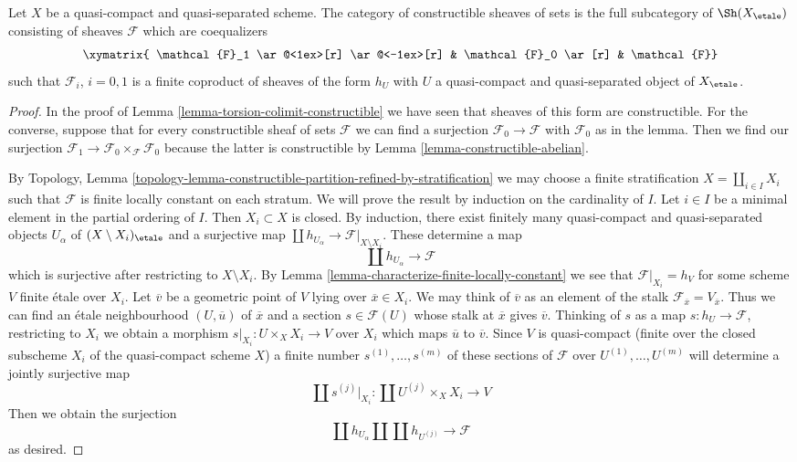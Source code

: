 \begin{lemma}
\label{lemma-category-constructible-sets}
Let $X$ be a quasi-compact and quasi-separated scheme. The category of
constructible sheaves of sets is the full subcategory of $\Sh(X_\etale)$
consisting of sheaves $\mathcal{F}$ which are coequalizers
$$
\xymatrix{
\mathcal{F}_1
\ar@<1ex>[r] \ar@<-1ex>[r]
&
\mathcal{F}_0 \ar[r]
&
\mathcal{F}}
$$
such that $\mathcal{F}_i$, $i = 0, 1$ is a finite coproduct of sheaves of
the form $h_U$ with $U$ a quasi-compact and quasi-separated
object of $X_\etale$.
\end{lemma}

\begin{proof}
In the proof of Lemma \ref{lemma-torsion-colimit-constructible}
we have seen that sheaves of this form are constructible.
For the converse, suppose that for every constructible sheaf of
sets $\mathcal{F}$ we can find a surjection $\mathcal{F}_0 \to \mathcal{F}$
with $\mathcal{F}_0$ as in the lemma. Then we find our surjection
$\mathcal{F}_1 \to \mathcal{F}_0 \times_\mathcal{F} \mathcal{F}_0$
because the latter is constructible by Lemma \ref{lemma-constructible-abelian}.

\medskip\noindent
By Topology, Lemma
\ref{topology-lemma-constructible-partition-refined-by-stratification}
we may choose a finite stratification
$X = \coprod_{i \in I} X_i$ such that $\mathcal{F}$ is finite locally
constant on each stratum. We will prove the result by induction on
the cardinality of $I$. Let $i \in I$ be a minimal element in the
partial ordering of $I$. Then $X_i \subset X$ is closed.
By induction, there exist finitely many quasi-compact and quasi-separated
objects $U_\alpha$ of $(X \setminus X_i)_\etale$ and a surjective
map $\coprod h_{U_\alpha} \to \mathcal{F}|_{X \setminus X_i}$.
These determine a map
$$
\coprod h_{U_\alpha} \to \mathcal{F}
$$
which is surjective after restricting to $X \setminus X_i$. By
Lemma \ref{lemma-characterize-finite-locally-constant}
we see that $\mathcal{F}|_{X_i} = h_V$ for some scheme $V$ finite \'etale
over $X_i$. Let $\overline{v}$ be a geometric point of $V$ lying
over $\overline{x} \in X_i$. We may think of $\overline{v}$ as an
element of the stalk $\mathcal{F}_{\overline{x}} = V_{\overline{x}}$.
Thus we can find an \'etale neighbourhood $(U, \overline{u})$
of $\overline{x}$ and a section $s \in \mathcal{F}(U)$ whose stalk at
$\overline{x}$ gives $\overline{v}$. Thinking of $s$ as a map
$s : h_U \to \mathcal{F}$, restricting to $X_i$ we obtain a morphism
$s|_{X_i} : U \times_X X_i \to V$ over $X_i$ which maps $\overline{u}$
to $\overline{v}$. Since $V$ is quasi-compact (finite over the closed
subscheme $X_i$ of the quasi-compact scheme $X$) a finite number
$s^{(1)}, \ldots, s^{(m)}$ of these sections of $\mathcal{F}$ over
$U^{(1)}, \ldots, U^{(m)}$ will determine a jointly
surjective map
$$
\coprod s^{(j)}|_{X_i} : \coprod U^{(j)} \times_X X_i \longrightarrow V
$$
Then we obtain the surjection
$$
\coprod h_{U_\alpha} \amalg \coprod h_{U^{(j)}} \to \mathcal{F}
$$
as desired.
\end{proof}

